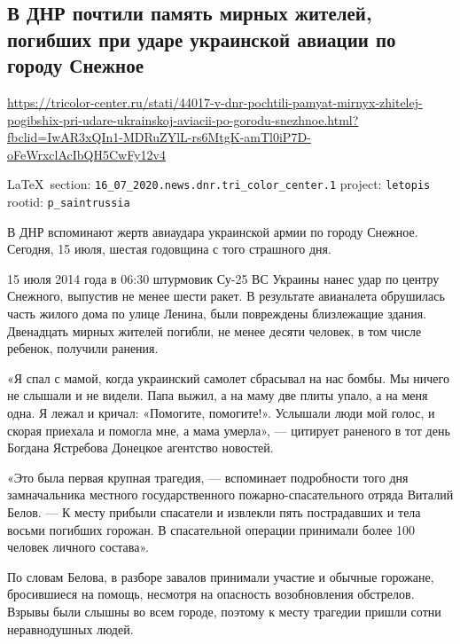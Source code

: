  
 

\def\sectitle{В ДНР почтили память мирных жителей, погибших при ударе
украинской авиации по городу Снежное}

\subsection{\sectitle}
\url{https://tricolor-center.ru/stati/44017-v-dnr-pochtili-pamyat-mirnyx-zhitelej-pogibshix-pri-udare-ukrainskoj-aviacii-po-gorodu-snezhnoe.html?fbclid=IwAR3xQIn1-MDRuZYlL-rs6MtgK-amTl0iP7D-oFeWrxclAcIbQH5CwFy12v4}
  
\vspace{0.5cm}
{\small\LaTeX~section: \verb|16_07_2020.news.dnr.tri_color_center.1| project: \verb|letopis| rootid: \verb|p_saintrussia|}
\vspace{0.5cm}

В ДНР вспоминают жертв авиаудара украинской армии по городу Снежное. Сегодня,
15 июля, шестая годовщина с того страшного дня.

15 июля 2014 года в 06:30 штурмовик Су-25 ВС Украины нанес удар по центру
Снежного, выпустив не менее шести ракет. В результате авианалета обрушилась
часть жилого дома по улице Ленина, были повреждены близлежащие здания.
Двенадцать мирных жителей погибли, не менее десяти человек, в том числе
ребенок, получили ранения.

«Я спал с мамой, когда украинский самолет сбрасывал на нас бомбы. Мы ничего не
слышали и не видели. Папа выжил, а на маму две плиты упало, а на меня одна. Я
лежал и кричал: «Помогите, помогите!». Услышали люди мой голос, и скорая
приехала и помогла мне, а мама умерла», — цитирует раненого в тот день Богдана
Ястребова Донецкое агентство новостей.

«Это была первая крупная трагедия, — вспоминает подробности того дня
замначальника местного государственного пожарно-спасательного отряда Виталий
Белов. — К месту прибыли спасатели и извлекли пять пострадавших и тела восьми
погибших горожан. В спасательной операции принимали более 100 человек личного
состава».

По словам Белова, в разборе завалов принимали участие и обычные горожане,
бросившиеся на помощь, несмотря на опасность возобновления обстрелов. Взрывы
были слышны во всем городе, поэтому к месту трагедии пришли сотни неравнодушных
людей.


